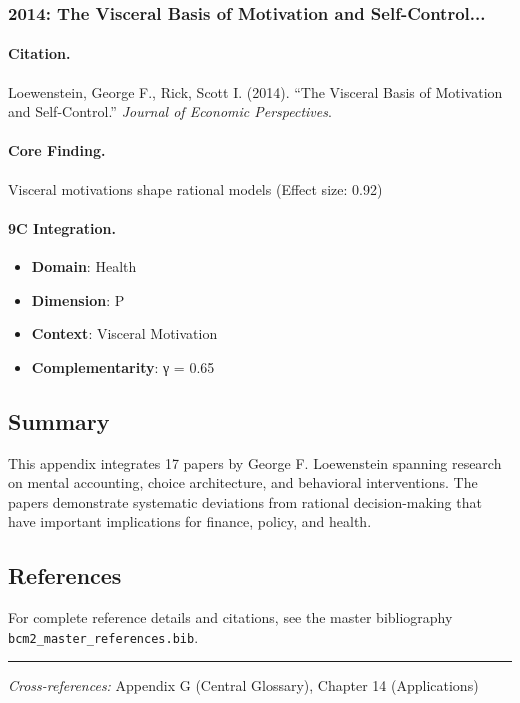 \subsubsection{2014: The Visceral Basis of Motivation and Self-Control...}

\paragraph{Citation.}
Loewenstein, George F., Rick, Scott I. (2014). ``The Visceral Basis of Motivation and Self-Control.''
\textit{Journal of Economic Perspectives}.

\paragraph{Core Finding.}
Visceral motivations shape rational models (Effect size: 0.92)

\paragraph{9C Integration.}
\begin{itemize}[nosep]
  \item \textbf{Domain}: Health
  \item \textbf{Dimension}: P
  \item \textbf{Context}: Visceral Motivation
  \item \textbf{Complementarity}: γ = 0.65
\end{itemize}

\subsection{Summary}

This appendix integrates 17 papers by George F. Loewenstein
spanning research on mental accounting, choice architecture, and behavioral
interventions. The papers demonstrate systematic deviations from rational
decision-making that have important implications for finance, policy, and health.

\subsection{References}

For complete reference details and citations, see the master bibliography
\texttt{bcm2\_master\_references.bib}.

\vspace{1em}
\hrule
\vspace{0.5em}

\noindent\textit{Cross-references:}
Appendix G (Central Glossary), Chapter 14 (Applications)
